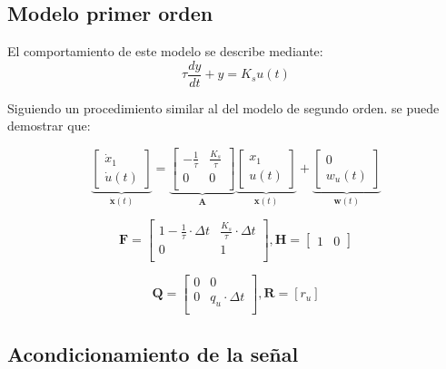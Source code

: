 \documentclass[conference]{IEEEtran}
\begin{document}
\subsection{Modelo primer orden}

El comportamiento de este modelo se describe mediante:
\[
\tau \frac{dy}{dt} + y = K_s u(t)
\]

Siguiendo un procedimiento similar al del modelo de segundo orden. se puede demostrar que:


\begin{equation*}
	\underbrace{
		\begin{bmatrix}
			\dot{x}_1 \\
			\dot{u}(t)
		\end{bmatrix}
	}_{\mathbf{\dot{x}}(t)}
	=
	\underbrace{\begin{bmatrix}
			-\frac{1}{\tau}           & \frac{K_s}{\tau}                 \\
			0 & 0   \\
	\end{bmatrix}}_{\mathbf{A}}
	\underbrace{\begin{bmatrix}
			x_1 \\
			u(t) 
	\end{bmatrix}}_{\mathbf{x}(t)}	
	+
	\underbrace{
		\begin{bmatrix}
			0 \\
			w_{u}(t)
		\end{bmatrix}
	}_{\mathbf{w}(t)}
\end{equation*}

\[
	\mathbf{F} = \begin{bmatrix}
		1 -\frac{1}{\tau} \cdot \Delta t          & \frac{K_s}{\tau} \cdot \Delta t               \\
		0 & 1 \\
	\end{bmatrix},
	\mathbf{H} =
	\begin{bmatrix}
		1 & 0
	\end{bmatrix}
\]

\[
\mathbf{Q} = \begin{bmatrix}
	0 & 0  \\
	0 & q_u \cdot \Delta t \\
\end{bmatrix}, 
\mathbf{R} = [r_u]
\]


\subsection{Acondicionamiento de la señal}
\end{document}

